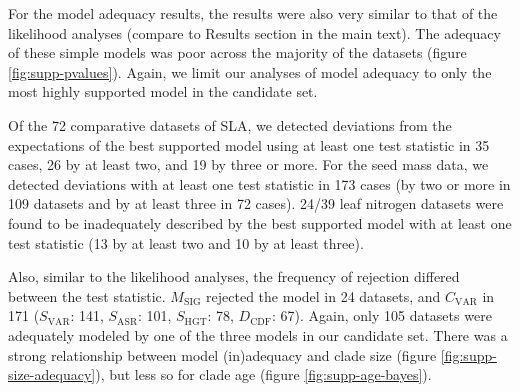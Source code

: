 \documentclass[a4paper,11pt]{article}
\begin{document}
For the model adequacy results, the results were also very similar to that of the likelihood analyses (compare to Results section in the main text). The adequacy of these simple models was poor across the majority of the datasets (figure \ref{fig:supp-pvalues}). Again, we limit our analyses of model adequacy to only the most highly supported model in the candidate set.

Of the 72 comparative datasets of SLA, we detected deviations from the expectations of the best supported model using at least one test statistic in 35 cases, 26 by at least two, and 19 by three or more.
For the seed mass data, we detected deviations with at least one test statistic in 173 cases (by two or more in 109 datasets and by at least three in 72 cases).
24/39 leaf nitrogen datasets were found to be inadequately described by the best supported model with at least one test statistic (13 by at least two and 10 by at least three).

Also, similar to the likelihood analyses, the frequency of rejection differed between the test statistic. $M_{\text{SIG}}$ rejected the model in 24 datasets, and $C_{\text{VAR}}$ in 171 ($S_{\text{VAR}}$: 141, $S_{\text{ASR}}$: 101, $S_{\text{HGT}}$: 78, $D_{\text{CDF}}$: 67). Again, only 105 datasets were adequately modeled by one of the three models in our candidate set. There was a strong relationship between model (in)adequacy and clade size (figure \ref{fig:supp-size-adequacy}), but less so for clade age (figure \ref{fig:supp-age-bayes}).
 
\end{document}
